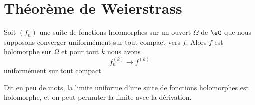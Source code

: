 \section{Théorème de Weierstrass}

\begin{theorem}       \label{ThoArYtQO}
	Soit \( (f_n)\) une suite de fonctions holomorphes sur un ouvert \( \Omega\) de \( \eC\) que nous supposons converger uniformément sur tout compact vers \( f\). Alors \( f\) est holomorphe sur \( \Omega\) et pour tout \( k\) nous avons
	\begin{equation}
		f^{(k)}_n\to f^{(k)}
	\end{equation}
	uniformément sur tout compact.

	Dit en peu de mots, la limite uniforme d'une suite de fonctions holomorphes est holomorphe, et on peut permuter la limite avec la dérivation.
\end{theorem}

